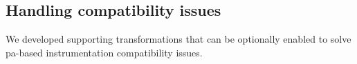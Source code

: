 \subsection{Handling compatibility issues}
We developed supporting transformations that can be optionally enabled to solve \gls{pa}-based instrumentation compatibility issues.


